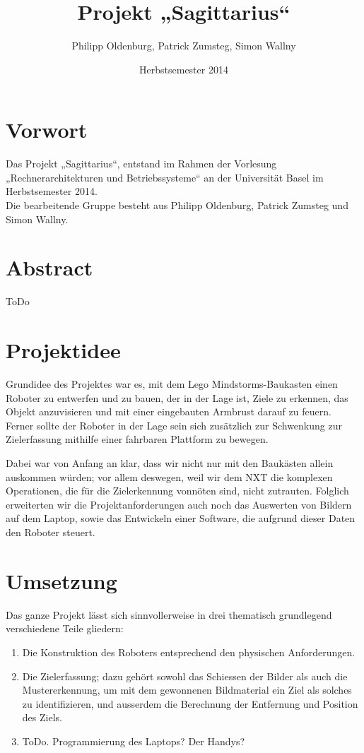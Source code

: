 \documentclass[12pt,a4paper]{article}
\author{Philipp Oldenburg, Patrick Zumsteg, Simon Wallny}
\title{Projekt „Sagittarius“}
\date{Herbstsemester 2014}
\begin{document}
\maketitle
\tableofcontents
\section{Vorwort}
Das Projekt „Sagittarius“, entstand im Rahmen der Vorlesung „Rechnerarchitekturen und Betriebssysteme“ an der Universität Basel im Herbstsemester 2014.\hfill\\
Die bearbeitende Gruppe besteht aus Philipp Oldenburg, Patrick Zumsteg und Simon Wallny.
\newpage
\section{Abstract}
ToDo\\

\section{Projektidee}

Grundidee des Projektes war es, mit dem Lego Mindstorms-Baukasten einen Roboter zu entwerfen und zu bauen, der in der Lage ist, Ziele zu erkennen, das Objekt anzuvisieren und mit einer eingebauten Armbrust darauf zu feuern.
Ferner sollte der Roboter in der Lage sein sich zusätzlich zur Schwenkung zur Zielerfassung mithilfe einer fahrbaren Plattform zu bewegen.

Dabei war von Anfang an klar, dass wir nicht nur mit den Baukästen allein auskommen würden; vor allem deswegen, weil wir dem NXT die komplexen Operationen, die für die Zielerkennung vonnöten sind, nicht zutrauten. Folglich erweiterten wir die Projektanforderungen auch noch das Auswerten von Bildern auf dem Laptop, sowie das Entwickeln einer Software, die aufgrund dieser Daten den Roboter steuert.

\section{Umsetzung}

Das ganze Projekt lässt sich sinnvollerweise in drei thematisch grundlegend verschiedene Teile gliedern:
\begin{enumerate}
\item
Die Konstruktion des Roboters entsprechend den physischen Anforderungen.
\item
Die Zielerfassung; dazu gehört sowohl das Schiessen der Bilder als auch die Mustererkennung, um mit dem gewonnenen Bildmaterial ein Ziel als solches zu identifizieren, und ausserdem die Berechnung der Entfernung und Position des Ziels.
\item
ToDo. Programmierung des Laptops? Der Handys?
\end{enumerate}
\end{document}
